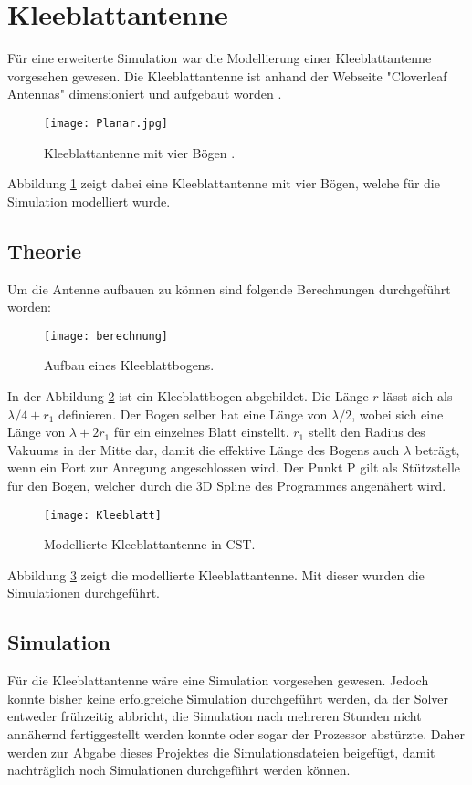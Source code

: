 \section{Kleeblattantenne}
Für eine erweiterte Simulation war die Modellierung einer Kleeblattantenne vorgesehen gewesen. Die Kleeblattantenne ist anhand der Webseite "Cloverleaf Antennas" dimensioniert und aufgebaut worden \cite{website}.

\begin{figure}[!ht]
	\centering
	\texttt{[image: Planar.jpg]}
	\caption{Kleeblattantenne mit vier Bögen \cite{website}.}\label{fig:Planar}
\end{figure} 

Abbildung \ref{fig:Planar} zeigt dabei eine Kleeblattantenne mit vier Bögen, welche für die Simulation modelliert wurde.

\subsection{Theorie}

Um die Antenne aufbauen zu können sind folgende Berechnungen durchgeführt worden:\\

\begin{figure}[!ht]
	\centering
	\texttt{[image: berechnung]}
	\caption{Aufbau eines Kleeblattbogens.}\label{fig:berechnung}
\end{figure}

In der Abbildung \ref*{fig:berechnung} ist ein Kleeblattbogen abgebildet. Die Länge $ r $ lässt sich als $ \lambda/4 + r_1 $ definieren. Der Bogen selber hat eine Länge von $\lambda/2$, wobei sich eine Länge von $\lambda + 2r_1$ für ein einzelnes Blatt einstellt. $r_1$ stellt den Radius des Vakuums in der Mitte dar, damit die effektive Länge des Bogens auch $\lambda$ beträgt, wenn ein Port zur Anregung angeschlossen wird. Der Punkt P gilt als Stützstelle für den Bogen, welcher durch die 3D Spline des Programmes angenähert wird.

\begin{figure}[!ht]
	\centering
	\texttt{[image: Kleeblatt]}
	\caption{Modellierte Kleeblattantenne in CST.}\label{fig:Kleeblatt}
\end{figure}

Abbildung \ref{fig:Kleeblatt} zeigt die modellierte Kleeblattantenne. Mit dieser wurden die Simulationen durchgeführt.

\subsection{Simulation}

Für die Kleeblattantenne wäre eine Simulation vorgesehen gewesen. Jedoch konnte bisher keine erfolgreiche Simulation durchgeführt werden, da der Solver entweder frühzeitig abbricht, die Simulation nach mehreren Stunden nicht annähernd fertiggestellt werden konnte oder sogar der Prozessor abstürzte. Daher werden zur Abgabe dieses Projektes die Simulationsdateien beigefügt, damit nachträglich noch Simulationen durchgeführt werden können.